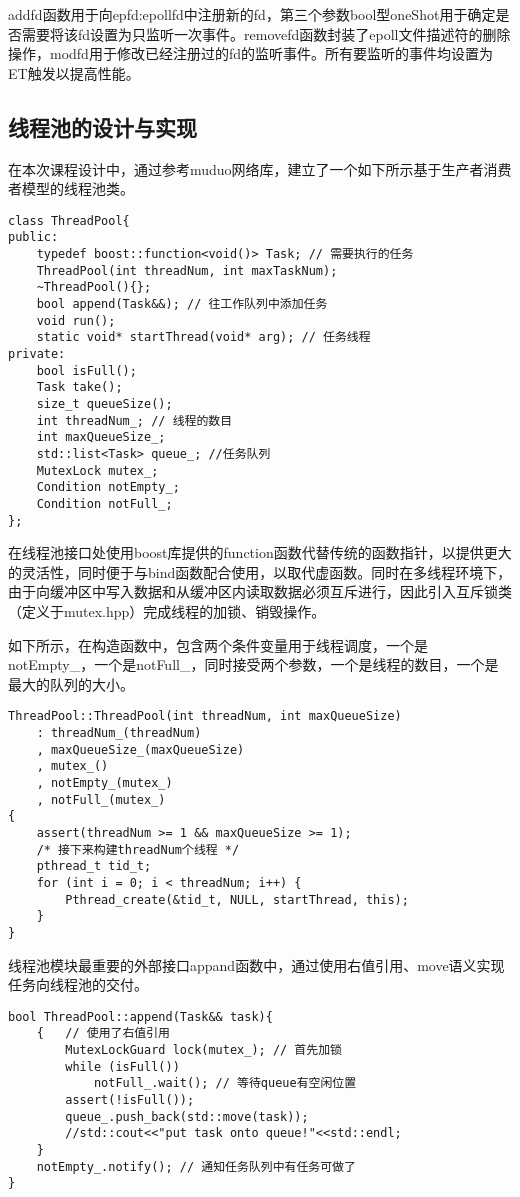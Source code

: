 \documentclass[bachelor]{thesis-uestc}
\begin{document}
addfd函数用于向epfd:epollfd中注册新的fd，第三个参数bool型oneShot用于确定是否需要将该fd设置为只监听一次事件。removefd函数封装了epoll文件描述符的删除操作，modfd用于修改已经注册过的fd的监听事件。所有要监听的事件均设置为ET触发以提高性能。

\subsection{线程池的设计与实现}
在本次课程设计中，通过参考muduo网络库，建立了一个如下所示基于生产者消费者模型的线程池类。
\begin{lstlisting}
class ThreadPool{
public:
	typedef boost::function<void()> Task; // 需要执行的任务 
	ThreadPool(int threadNum, int maxTaskNum);
	~ThreadPool(){};
	bool append(Task&&); // 往工作队列中添加任务 
	void run();
	static void* startThread(void* arg); // 任务线程 
private:
	bool isFull();
	Task take();
	size_t queueSize();
	int threadNum_; // 线程的数目
	int maxQueueSize_;
	std::list<Task> queue_; //任务队列 
	MutexLock mutex_;
	Condition notEmpty_;
	Condition notFull_;
};
\end{lstlisting}

在线程池接口处使用boost库提供的function函数代替传统的函数指针，以提供更大的灵活性，同时便于与bind函数配合使用，以取代虚函数。同时在多线程环境下，由于向缓冲区中写入数据和从缓冲区内读取数据必须互斥进行，因此引入互斥锁类（定义于mutex.hpp）完成线程的加锁、销毁操作。

如下所示，在构造函数中，包含两个条件变量用于线程调度，一个是notEmpty\_，一个是notFull\_，同时接受两个参数，一个是线程的数目，一个是最大的队列的大小。

\begin{lstlisting}
ThreadPool::ThreadPool(int threadNum, int maxQueueSize)
    : threadNum_(threadNum)
    , maxQueueSize_(maxQueueSize)
    , mutex_()
    , notEmpty_(mutex_)
    , notFull_(mutex_)
{
    assert(threadNum >= 1 && maxQueueSize >= 1);
    /* 接下来构建threadNum个线程 */
    pthread_t tid_t;
    for (int i = 0; i < threadNum; i++) {
        Pthread_create(&tid_t, NULL, startThread, this);
    }
}
\end{lstlisting}

线程池模块最重要的外部接口appand函数中，通过使用右值引用、move语义实现任务向线程池的交付。
\begin{lstlisting}
bool ThreadPool::append(Task&& task){
	{   // 使用了右值引用
		MutexLockGuard lock(mutex_); // 首先加锁
		while (isFull())
			notFull_.wait(); // 等待queue有空闲位置
		assert(!isFull());
		queue_.push_back(std::move(task)); 
		//std::cout<<"put task onto queue!"<<std::endl;
	}
	notEmpty_.notify(); // 通知任务队列中有任务可做了
}
\end{lstlisting}
\end{document}
